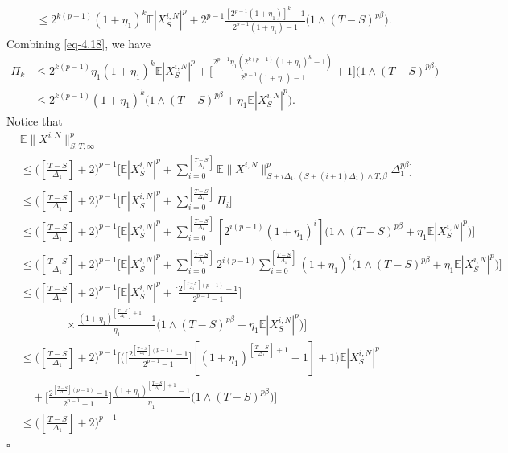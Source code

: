 \documentclass[12pt]{article}
\def\E{\mathbb E}
\newenvironment{proof}{{\noindent\it Proof.}\ }{\hfill $\square$\par}
\numberwithin{equation}{section}
\begin{document}
\begin{proof}
\begin{equation}
\begin{aligned}
				&\leq 2^{k(p-1)}(1+\eta_1)^k\E|X^{i,N}_S|^p+2^{p-1}\frac{[2^{p-1}(1+\eta_1)]^k-1}{2^{p-1}(1+\eta_1)-1}\big(1\wedge (T-S)^{p\beta} \big).
			\end{aligned}
		\end{equation}
		Combining \eqref{eq-4.18}, we have
		\begin{align*}
			\Pi_k
			&\leq 2^{k(p-1)}\eta_1(1+\eta_1)^k\E|X^{i,N}_S|^p+\Big[\frac{2^{p-1}\eta_1(2^{k(p-1)}(1+\eta_1)^k-1)}{2^{p-1}(1+\eta_1)-1}+1\Big]\big(1\wedge (T-S)^{p\beta} \big)\\
			&\leq 2^{k(p-1)}(1+\eta_1)^k\Big(1\wedge (T-S)^{p\beta}+\eta_1\E|X^{i,N}_S|^p\Big).
		\end{align*}
		Notice that
			\begin{align*}
				&\E\|X^{i,N}\|^p_{S,T,\infty}\\
				&\leq
				\big([\frac{T-S}{\Delta_1}]+2 \big)^{p-1} \Big[\E|X^{i,N}_S|^p+\sum_{i=0}^{[\frac{T-S}{\Delta_1}]}\E\|X^{i,N}\|^p_{S+i\Delta_1,(S+(i+1)\Delta_1)\wedge T,\beta}\Delta_1^{p\beta}\Big]\\
				&\leq \big([\frac{T-S}{\Delta_1}]+2 \big)^{p-1}
				\Big[\E|X^{i,N}_S|^p+\sum_{i=0}^{[\frac{T-S}{\Delta_1}]}\Pi_i\Big]\\
				&\leq \big([\frac{T-S}{\Delta_1}]+2 \big)^{p-1}
				\Big[\E|X^{i,N}_S|^p+\sum_{i=0}^{[\frac{T-S}{\Delta_1}]}[2^{i(p-1)}(1+\eta_1)^i]\Big(1\wedge (T-S)^{p\beta}+\eta_1\E|X^{i,N}_S|^p\Big)\Big]\\
				&\leq \big([\frac{T-S}{\Delta_1}]+2 \big)^{p-1}
				\Big[\E|X^{i,N}_S|^p+\sum_{i=0}^{[\frac{T-S}{\Delta_1}]}2^{i(p-1)}\sum_{i=0}^{[\frac{T-S}{\Delta_1}]}(1+\eta_1)^i\Big(1\wedge (T-S)^{p\beta}+\eta_1\E|X^{i,N}_S|^p\Big)\Big]\\
				&\leq \big([\frac{T-S}{\Delta_1}]+2 \big)^{p-1}
				\Big[\E|X^{i,N}_S|^p+\Big[\frac{2^{[\frac{T-S}{\Delta_1}](p-1)}-1}{2^{p-1}-1}\Big]\\
				&\quad\quad\quad\quad\times\frac{(1+\eta_1)^{[\frac{T-S}{\Delta_1}]+1}-1}{\eta_1}\Big(1\wedge (T-S)^{p\beta}+\eta_1\E|X^{i,N}_S|^p\Big)\Big]\\
				&\leq \big([\frac{T-S}{\Delta_1}]+2 \big)^{p-1}
				\Big[\Big(\Big[\frac{2^{[\frac{T-S}{\Delta_1}](p-1)}-1}{2^{p-1}-1}\Big][(1+\eta_1)^{[\frac{T-S}{\Delta_1}]+1}-1]+1\Big)\E|X^{i,N}_S|^p\\
				&\quad+\Big[\frac{2^{[\frac{T-S}{\Delta_1}](p-1)}-1}{2^{p-1}-1}\Big]\frac{(1+\eta_1)^{[\frac{T-S}{\Delta_1}]+1}-1}{\eta_1}\Big(1\wedge (T-S)^{p\beta}\Big)\Big]\\
				&\leq \big([\frac{T-S}{\Delta_1}]+2 \big)^{p-1}

\end{align*}
\end{proof}
\end{document}

